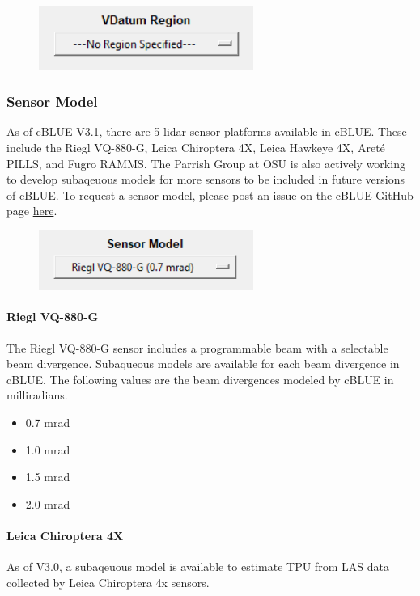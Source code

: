 \documentclass[11pt, a4paper]{article}
\begin{document}
\begin{figure}[H]
    \centering
    \includegraphics[width=7cm]{figs/vdatum_region_gui.png}
\end{figure}

\subsubsection{Sensor Model}
As of cBLUE V3.1, there are 5 lidar sensor platforms available in cBLUE. These include the Riegl VQ-880-G, Leica Chiroptera 4X, Leica Hawkeye 4X, Areté PILLS, and Fugro RAMMS. The Parrish Group at OSU is also actively working to develop subaqeuous models for more sensors to be included in future versions of cBLUE. To request a sensor model, please post an issue on the cBLUE GitHub page \href{https://github.com/parrishOSU/cBLUE.github.io/issues}{here}.

\begin{figure}[H]
    \centering
    \includegraphics[width=7cm]{figs/sensor_model_gui.png}
\end{figure}

\paragraph{Riegl VQ-880-G}
The Riegl VQ-880-G sensor includes a programmable beam with a selectable beam divergence. Subaqueous models are available for each beam divergence in cBLUE. The following values are the beam divergences modeled by cBLUE in milliradians.
\begin{itemize}
    \item 0.7 mrad
    \item 1.0 mrad
    \item 1.5 mrad
    \item 2.0 mrad
\end{itemize}
\paragraph{Leica Chiroptera 4X}
As of V3.0, a subaqeuous model is available to estimate TPU from LAS data collected by Leica Chiroptera 4x sensors.
\end{document}

